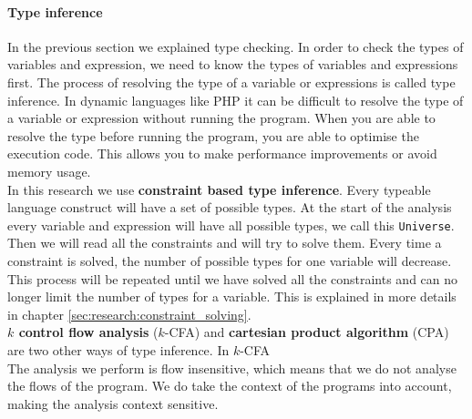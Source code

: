 \documentclass[../main.tex]{subfiles}
\begin{document}
    \paragraph{Type inference}
    In the previous section we explained type checking.
    In order to check the types of variables and expression, we need to know the types of variables and expressions first.
    The process of resolving the type of a variable or expressions is called type inference.
    In dynamic languages like PHP it can be difficult to resolve the type of a variable or expression without running the program.
    When you are able to resolve the type before running the program, you are able to optimise the execution code.
    This allows you to make performance improvements or avoid memory usage.
    \\
    In this research we use \textbf{constraint based type inference}.
    Every typeable language construct will have a set of possible types.
    At the start of the analysis every variable and expression will have all possible types, we call this \texttt{Universe}.
    Then we will read all the constraints and will try to solve them.
    Every time a constraint is solved, the number of possible types for one variable will decrease.
    This process will be repeated until we have solved all the constraints and can no longer limit the number of types for a variable.
    This is explained in more details in chapter \ref{sec:research:constraint_solving}.
    \\
    \textbf{$k$ control flow analysis} ($k$-CFA) and \textbf{cartesian product algorithm} (CPA) are two other ways of type inference.
    In $k$-CFA
    \\
    The analysis we perform is flow insensitive, which means that we do not analyse the flows of the program.
    We do take the context of the programs into account, making the analysis context sensitive.
    
\end{document}
